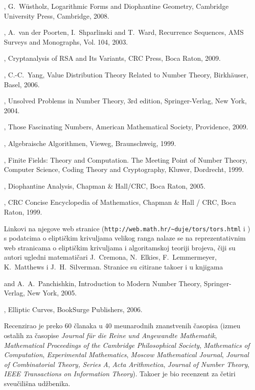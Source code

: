 \documentclass[11pt]{report}
\begin{document}
\medskip
{\footnotesize

, {\sc G.~W\"ustholz}, Logarithmic Forms and Diophantine Geometry,
Cambridge University Press, Cambridge, 2008.

, {\sc A.~van der Poorten}, {\sc I.~Shparlinski}
and {\sc T.~Ward}, Recurrence Sequences, AMS Surveys and
Monographs, Vol. 104, 2003.

, Cryptanalysis of RSA and Its Variants, CRC Press, Boca Raton, 2009.

, {\sc C.-C.~Yang}, Value Distribution Theory Related to Number Theory, Birkh\"auser, Basel, 2006.

, Unsolved Problems in Number Theory,
3rd edition, Springer-Verlag, New York, 2004.

,
Those Fascinating Numbers, American Mathematical Society, Providence, 2009.

, Algebraische Algorithmen, Vieweg,
Braunschweig, 1999.

, Finite Fields: Theory and Computation.
The Meeting Point of Number Theory, Computer Science, Coding Theory and Cryptography, Kluwer, Dordrecht, 1999.

, Diophantine Analysis, Chapman \& Hall/CRC, Boca Raton, 2005.

, CRC Concise Encyclopedia of
Mathematics, Chapman \& Hall / CRC, Boca Raton, 1999.
}
\medskip

Linkovi na njegove web stranice ({\tt http://web.math.hr/\~{}duje/tors/tors.html}
i )
s podatcima o elip\-ti\-\v{c}kim krivuljama velikog ranga
nalaze se na reprezentativnim web stranicama o elipti\v{c}kim krivuljama
i algoritamskoj teoriji brojeva, \v{c}iji su autori
ugledni matemati\v{c}ari {\sc
J.~Cremona}, {\sc N.~Elkies}, {\sc F.~Lemmermeyer}, {\sc
K.~Matthews} i {\sc J.~H.~Silverman}. Stranice su citirane tako{\dj}er i u knjigama

\medskip
{\footnotesize
{} and {\sc A.~A.~Panchishkin}, Introduction to Modern Number Theory,
Springer-Verlag, New York, 2005.

, Elliptic Curves, BookSurge Publishers, 2006.
}
\medskip

Recenzirao je preko 60 \v{c}lanaka u 40 me\dj{}unarodnih znanstvenih \v{c}asopisa (izme\dj{}u ostalih
za \v{c}asopise {\it Journal f\"ur die Reine und Angewandte Mathematik},
{\it Mathematical Proceedings of the Cambridge Philosophical Society},
{\it Mathematics of Computation},
{\it Experimental Mathematics},
{\it Moscow Mathematical Journal}, {\it Journal of Combinatorial Theory, Series A},
{\it Acta Arithmetica}, {\it Journal of Number Theory},
{\it IEEE Transactions on Information Theory}).
Tako\dj{}er je bio recenzent za \v{c}etiri sveu\v{c}ili\v{s}na ud\v{z}benika.
\end{document}
